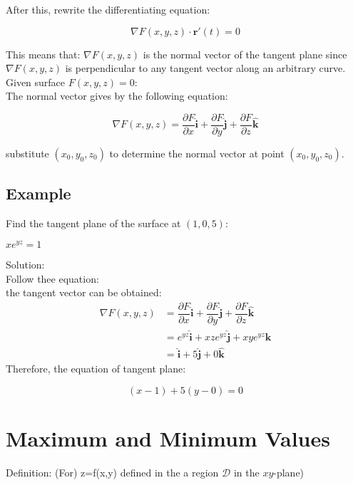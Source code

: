 \documentclass[UTF8,a4paper, 10pt, openany]{svmono}
\begin{document}
After this, rewrite the differentiating equation:

\begin{equation}
\boxed{
\nabla F(x,y,z)\cdot \mathbf{r}'(t)=0
}
\end{equation}

This means that: $\nabla F(x,y,z)$ is the normal vector of the tangent plane since $\nabla F(x,y,z)$ is perpendicular to any tangent vector along an arbitrary curve.\\ 

Given surface $F(x,y,z)=0$:\\

The normal vector gives by the following equation:

\begin{equation}
\boxed{
\nabla F(x,y,z)=\dfrac{\partial F}{\partial x}\mathbf{\hat{i}}+\dfrac{\partial F}{\partial y}\mathbf{\hat{j}}+\dfrac{\partial F}{\partial z}\mathbf{\hat{k}}
}
\end{equation}

substitute $(x_0,y_0,z_0)$ to determine the normal vector at point $(x_0,y_0,z_0)$.

\subsection{Example}
Find the tangent plane of the surface at $(1,0,5)$:
\begin{center}
$xe^{yz}=1$
\end{center}
Solution:\\
Follow thee equation:\\
the tangent vector can be obtained:
\begin{align*}
\nabla F(x,y,z)&=\dfrac{\partial F}{\partial x}\mathbf{\hat{i}}+\dfrac{\partial F}{\partial y}\mathbf{\hat{j}}+\dfrac{\partial F}{\partial z}\mathbf{\hat{k}}\\
&= e^{yz}\mathbf{\hat{i}}+xze^{yz}\mathbf{\hat{j}}+xye^{yz}\mathbf{\hat{k}}\\
&= \mathbf{\hat{i}}+5\mathbf{\hat{j}}+0\mathbf{\hat{k}}
\end{align*}
Therefore, the equation of tangent plane:

\[(x-1)+5(y-0)=0\]

\section{Maximum and Minimum Values}
Definition: (For) z=f(x,y) defined in the a region $\mathcal{D}$ in the $xy$-plane)
\end{document}
